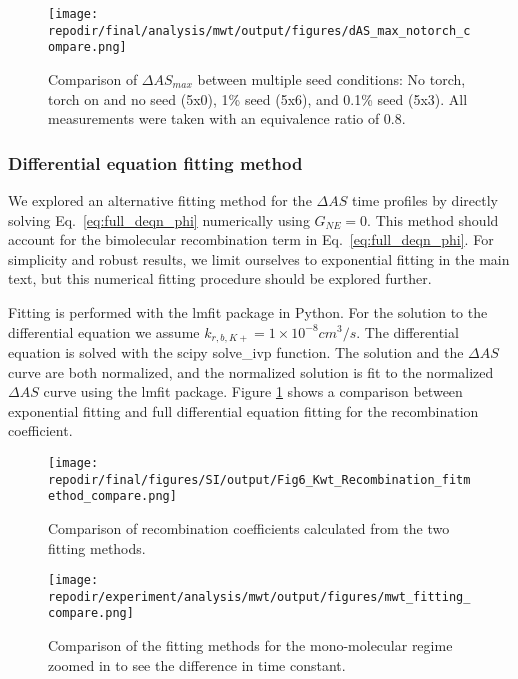 \begin{figure}[]
\centering
\texttt{[image: \\repodir/final/analysis/mwt/output/figures/dAS\_max\_notorch\_compare.png]}
\caption{Comparison of $\Delta AS_{max}$ between multiple seed conditions: No torch, torch on and no seed (5x0), 1\% seed (5x6), and 0.1\% seed (5x3). All measurements were taken with an equivalence ratio of 0.8.}
\end{figure}

\label{sec:mwt-diff-eq-fitting}
\subsubsection{Differential equation fitting method }

We explored an alternative fitting method for the $\Delta AS$ time profiles by directly solving Eq.\ \ref{eq:full_deqn_phi} numerically using $G_{NE} = 0$. This method should account for the bimolecular recombination term in Eq.\ \ref{eq:full_deqn_phi}. For simplicity and robust results, we limit ourselves to exponential fitting in the main text, but this numerical fitting procedure should be explored further. %

Fitting is performed with the lmfit package in Python. For the solution to the differential equation we assume $k_{r,b,K+} = 1 \times 10^{-8} cm^3/s$. The differential equation is solved with the scipy solve\_ivp function. The solution and the $\Delta AS$ curve are both normalized, and the normalized solution is fit to the normalized $\Delta AS$ curve using the lmfit package. Figure \ref{fig:SI_Kwt_Recombination_fitmethod_compare} shows a comparison between exponential fitting and full differential equation fitting for the recombination coefficient. 

\begin{figure}[]
\centering
\texttt{[image: \\repodir/final/figures/SI/output/Fig6\_Kwt\_Recombination\_fitmethod\_compare.png]}
\caption{Comparison of recombination coefficients calculated from the two fitting methods.}
\label{fig:SI_Kwt_Recombination_fitmethod_compare}
\end{figure}

\begin{figure}
\centering
\texttt{[image: \\repodir/experiment/analysis/mwt/output/figures/mwt\_fitting\_compare.png]}
\caption{Comparison of the fitting methods for the mono-molecular regime zoomed in to see the difference in time constant. }
\label{fig:SI_mwt_fitting_compare}
\end{figure}

